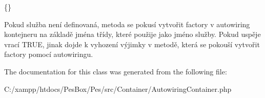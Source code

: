 \{\}

Pokud služba není definovaná, metoda se pokusí vytvořit factory v autowiring kontejneru na základě jména třídy, které použije jako jméno služby. Pokud uspěje vrací T\+R\+UE, jinak dojde k vyhození výjimky v metodě, která se pokouší vytvořit factory pomocí autowiringu. 

The documentation for this class was generated from the following file\+:\begin{DoxyCompactItemize}
\item 
C\+:/xampp/htdocs/\+Pes\+Box/\+Pes/src/\+Container/Autowiring\+Container.\+php\end{DoxyCompactItemize}
